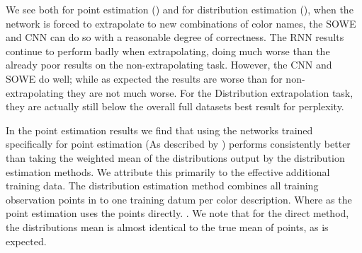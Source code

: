 \documentclass[11pt,a4paper]{article}
\begin{document}
We see both for point estimation () and for distribution estimation (), when the network is forced to extrapolate to new combinations of color names, the SOWE and CNN can do so with a reasonable degree of correctness.
The RNN results continue to perform badly when extrapolating, doing much worse than the already poor results on the non-extrapolating task.
However, the CNN and SOWE do well; while as expected the results are worse than for non-extrapolating they are not much worse.
For the Distribution extrapolation task, they are actually still below the overall full datasets best result for perplexity.

In the point estimation results we find that using the networks trained specifically for point estimation (As described by ) performs consistently better than taking the weighted mean of the distributions output by the distribution estimation methods.
We attribute this primarily to the effective additional training data.
The distribution estimation method combines all training observation points in to one training datum per color description.
Where as the point estimation uses the points directly.
.
We note that for the direct method, the distributions mean is almost identical to the true mean of points, as is expected.




\end{document}
